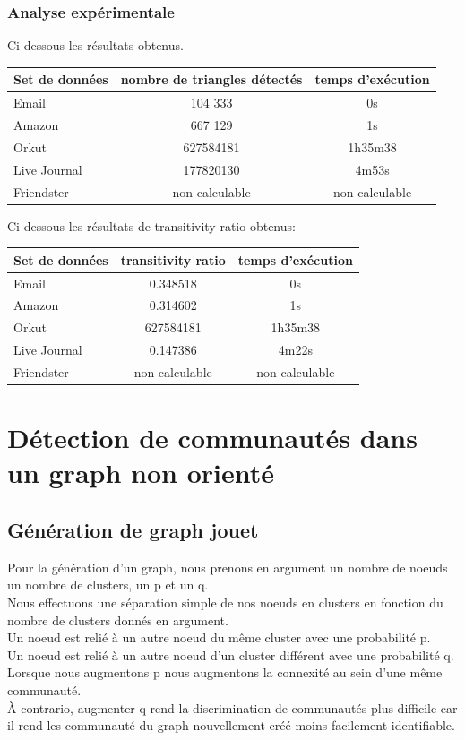 \documentclass[a4paper,10pt]{report}
\begin{document}
\subsection{Analyse expérimentale}
Ci-dessous les résultats obtenus.
\newline
\begin{center}
    \begin{tabular}{|l|c|c|}
    \hline
     Set de données & nombre de triangles détectés& temps d'exécution\\ \hline
     Email & 104 333& 0s\\ 
     Amazon &667 129& 1s\\ 
     Orkut & 627584181& 1h35m38 \\
     Live Journal &177820130 & 4m53s\\ 
     Friendster &non calculable & non calculable\\ 
     \hline
    \end{tabular}
\end{center}
Ci-dessous les résultats de transitivity ratio obtenus:
\\
\begin{center}
    \begin{tabular}{|l|c|c|}
    \hline
     Set de données & transitivity ratio & temps d'exécution\\ \hline
     Email & 0.348518& 0s\\ 
     Amazon &0.314602& 1s\\ 
     Orkut & 627584181& 1h35m38 \\
     Live Journal &0.147386 & 4m22s\\ 
     Friendster &non calculable & non calculable\\ 
     \hline
    \end{tabular}
\end{center}
\chapter{Détection de communautés dans un graph non orienté}
\section{Génération de graph jouet}
Pour la génération d'un graph, nous prenons en argument un nombre de noeuds un nombre de clusters, un p et un q.
\\
Nous effectuons une séparation simple de nos noeuds en clusters en fonction du nombre de clusters donnés en argument.
\\
Un noeud est relié à un autre noeud du même cluster avec une probabilité p.
\\
Un noeud est relié à un autre noeud d'un cluster différent avec une probabilité q.
\newline
\newline
Lorsque nous augmentons p nous augmentons la connexité au sein d'une même communauté.
\\
À contrario, augmenter q rend la discrimination de communautés plus difficile car il rend les communauté du graph nouvellement créé moins facilement identifiable.
\end{document}
